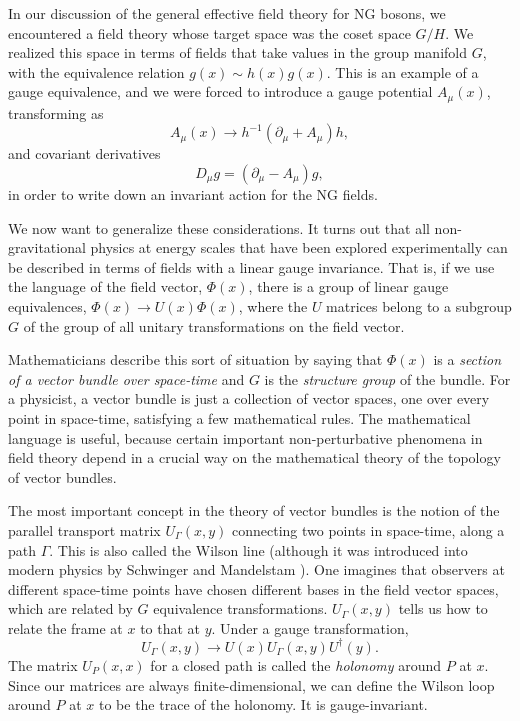 
In our discussion of the general effective field theory for NG bosons, we
encountered a field theory whose target space was the coset space $G/H$. We
realized this space in terms of fields that take values in the group manifold
$G$, with the equivalence relation $g(x)\sim h(x)g(x)$. This is an example of
a gauge equivalence, and we were forced to introduce a gauge potential
$A_\mu(x)$, transforming as
\begin{equation*}
  A_\mu(x)\longrightarrow h^{-1}(\partial_\mu+A_\mu)h,
\end{equation*}
and covariant derivatives
\begin{equation*}
  D_\mu g=(\partial_\mu-A_\mu)g,
\end{equation*}
in order to write down an invariant action for the NG fields.

We now want to generalize these considerations. It turns out that all
non-gravitational physics at energy scales that have been explored
experimentally can be described in terms of fields with a linear gauge
invariance. That is, if we use the language of the field vector, $\Phi(x)$,
there is a group of linear gauge equivalences, $\Phi(x)\to U(x)\Phi(x)$, where
the $U$ matrices belong to a subgroup $G$ of the group of all unitary
transformations on the field vector.

Mathematicians describe this sort of situation by saying that $\Phi(x)$ is a
\emph{section of a vector bundle over space-time} and $G$ is the
\emph{structure group} of the bundle. For a physicist, a vector bundle is just
a collection of vector spaces, one over every point in space-time, satisfying a
few mathematical rules. The mathematical language is useful, because certain
important non-perturbative phenomena in field theory depend in a crucial way on
the mathematical theory of the topology of vector bundles.

The most important concept in the theory of vector bundles is the notion of the
parallel transport matrix $U_\Gamma(x,y)$ connecting two points in space-time,
along a path $\Gamma$. This is also called the Wilson line (although it was
introduced into modern physics by Schwinger and Mandelstam
\cite{banks-ref-43,banks-ref-44,banks-ref-45}). One imagines that observers at different space-time points have
chosen different bases in the field vector spaces, which are related by $G$
equivalence transformations. $U_\Gamma(x,y)$ tells us how to relate the frame
at $x$ to that at $y$. Under a gauge transformation,
\begin{equation*}
  U_\Gamma(x,y)\longrightarrow U(x)U_\Gamma(x,y)U^\dagger(y).
\end{equation*}
The matrix $U_P(x,x)$ for a closed path is called the \emph{holonomy} around
$P$ at $x$. Since our matrices are always finite-dimensional, we can define the
Wilson loop around $P$ at $x$ to be the trace of the holonomy. It is
gauge-invariant.

